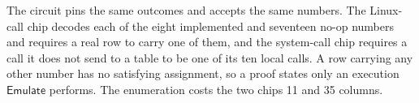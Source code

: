 The circuit pins the same outcomes and accepts the same numbers. The Linux-call chip decodes each of the eight implemented and seventeen no-op numbers and requires a real row to carry one of them, and the system-call chip requires a call it does not send to a table to be one of its ten local calls. A row carrying any other number has no satisfying assignment, so a proof states only an execution $\mathsf{Emulate}$ performs. The enumeration costs the two chips 11 and 35 columns.
